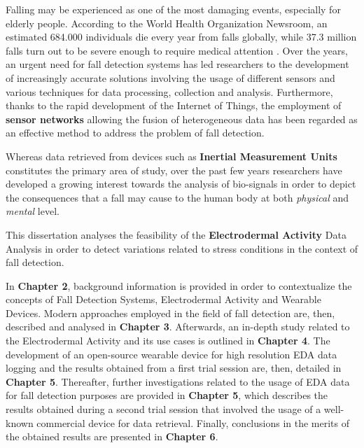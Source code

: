 \label{ch:introduction}

Falling may be experienced as one of the most damaging events, especially for elderly people. According to the World Health Organization Newsroom, an estimated 684.000 individuals die every year from falls globally, while 37.3 million falls turn out to be severe enough to require medical attention \cite{WhoData}. 
Over the years, an urgent need for fall detection systems has led researchers to the development of increasingly accurate solutions involving the usage of different sensors and various techniques for data processing, collection and analysis.
Furthermore, thanks to the rapid development of the Internet of Things, the employment of \textbf{sensor networks} allowing the fusion of heterogeneous data has been regarded as an effective method to address the problem of fall detection.

Whereas data retrieved from devices such as \textbf{Inertial Measurement Units} constitutes the primary area of study, over the past few years researchers have developed a growing interest towards the analysis of bio-signals in order to depict the consequences that a fall may cause to the human body at both \textit{physical} and \textit{mental} level.

This dissertation analyses the feasibility of the \textbf{Electrodermal Activity} Data Analysis in order to detect variations related to stress conditions in the context of fall detection. 

In \textbf{Chapter 2}, background information is provided in order to contextualize the concepts of Fall Detection Systems, Electrodermal Activity and Wearable Devices. Modern approaches employed in the field of fall detection are, then, described and analysed in \textbf{Chapter 3}. Afterwards, an in-depth study related to the Electrodermal Activity and its use cases is outlined in \textbf{Chapter 4}. The development of an open-source wearable device for high resolution EDA data logging and the results obtained from a first trial session are, then, detailed in \textbf{Chapter 5}. Thereafter, further investigations related to the usage of EDA data for fall detection purposes are provided in \textbf{Chapter 5}, which describes the results obtained during a second trial session that involved the usage of a well-known commercial device for data retrieval. Finally, conclusions in the merits of the obtained results are presented in \textbf{Chapter 6}.
